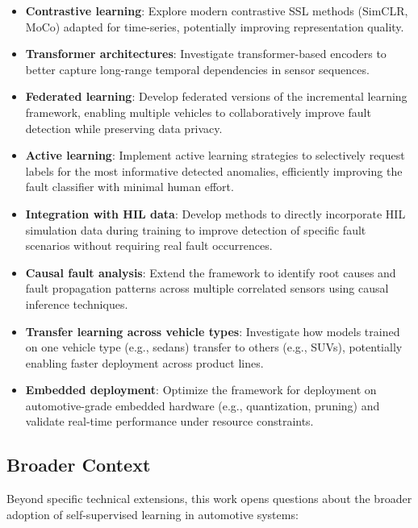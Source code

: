\begin{itemize}
    \item \textbf{Contrastive learning}: Explore modern contrastive SSL methods (SimCLR, MoCo) adapted for time-series, potentially improving representation quality.

    \item \textbf{Transformer architectures}: Investigate transformer-based encoders to better capture long-range temporal dependencies in sensor sequences.

    \item \textbf{Federated learning}: Develop federated versions of the incremental learning framework, enabling multiple vehicles to collaboratively improve fault detection while preserving data privacy.

    \item \textbf{Active learning}: Implement active learning strategies to selectively request labels for the most informative detected anomalies, efficiently improving the fault classifier with minimal human effort.

    \item \textbf{Integration with HIL data}: Develop methods to directly incorporate HIL simulation data during training to improve detection of specific fault scenarios without requiring real fault occurrences.

    \item \textbf{Causal fault analysis}: Extend the framework to identify root causes and fault propagation patterns across multiple correlated sensors using causal inference techniques.

    \item \textbf{Transfer learning across vehicle types}: Investigate how models trained on one vehicle type (e.g., sedans) transfer to others (e.g., SUVs), potentially enabling faster deployment across product lines.

    \item \textbf{Embedded deployment}: Optimize the framework for deployment on automotive-grade embedded hardware (e.g., quantization, pruning) and validate real-time performance under resource constraints.
\end{itemize}

\subsection{Broader Context}

Beyond specific technical extensions, this work opens questions about the broader adoption of self-supervised learning in automotive systems:

